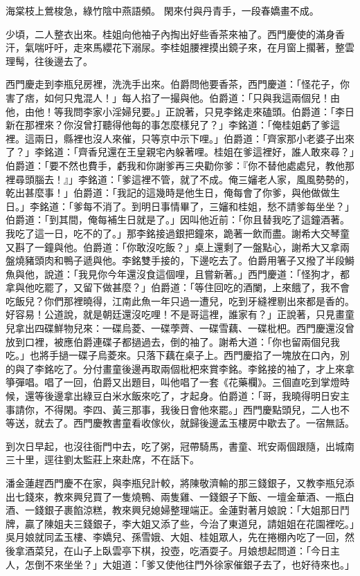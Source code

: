 海棠枝上鶯梭急，綠竹陰中燕語頻。
閑來付與丹青手，一段春嬌畫不成。

少頃，二人整衣出來。桂姐向他袖子內掏出好些香茶來袖了。西門慶使的滿身香汗，氣喘吁吁，走來馬纓花下溺尿。李桂姐腰裡摸出鏡子來，在月窗上擱著，整雲理髩，往後邊去了。

西門慶走到李瓶兒房裡，洗洗手出來。伯爵問他要香茶，西門慶道：「怪花子，你害了痞，如何只鬼混人！」每人掐了一撮與他。伯爵道：「只與我這兩個兒！由他，由他！等我問李家小淫婦兒要。」正說著，只見李銘走來磕頭。伯爵道：「李日新在那裡來？你沒曾打聽得他每的事怎麼樣兒了？」李銘道：「俺桂姐虧了爹這裡。這兩日，縣裡也沒人來催，只等京中示下哩。」伯爵道：「齊家那小老婆子出來了？」李銘道：「齊香兒還在王皇親宅內躲著哩。桂姐在爹這裡好，誰人敢來尋？」伯爵道：「要不然也費手，虧我和你謝爹再三央勸你爹：『你不替他處處兒，教他那裡尋頭腦去！』」李銘道：「爹這裡不管，就了不成。俺三嬸老人家，風風勢勢的，乾出甚麼事！」伯爵道：「我記的這幾時是他生日，俺每會了你爹，與他做做生日。」李銘道：「爹每不消了。到明日事情畢了，三嬸和桂姐，愁不請爹每坐坐？」伯爵道：「到其間，俺每補生日就是了。」因叫他近前：「你且替我吃了這鐘酒著。我吃了這一日，吃不的了。」那李銘接過銀把鐘來，跪著一飲而盡。謝希大交琴童又斟了一鐘與他。伯爵道：「你敢沒吃飯？」桌上還剩了一盤點心，謝希大又拿兩盤燒豬頭肉和鴨子遞與他。李銘雙手接的，下邊吃去了。伯爵用箸子又撥了半段鰣魚與他，說道：「我見你今年還沒食這個哩，且嘗新著。」西門慶道：「怪狗才，都拿與他吃罷了，又留下做甚麼？」伯爵道：「等住回吃的酒闌，上來餓了，我不會吃飯兒？你們那裡曉得，江南此魚一年只過一遭兒，吃到牙縫裡剔出來都是香的。好容易！公道說，就是朝廷還沒吃哩！不是哥這裡，誰家有？」正說著，只見畫童兒拿出四碟鮮物兒來：一碟烏菱、一碟荸薺、一碟雪藕、一碟枇杷。西門慶還沒曾放到口裡，被應伯爵連碟子都撾過去，倒的袖了。謝希大道：「你也留兩個兒我吃。」也將手撾一碟子烏菱來。只落下藕在桌子上。西門慶掐了一塊放在口內，別的與了李銘吃了。分付畫童後邊再取兩個枇杷來賞李銘。李銘接的袖了，才上來拿箏彈唱。唱了一回，伯爵又出題目，叫他唱了一套《花藥欄》。三個直吃到掌燈時候，還等後邊拿出綠豆白米水飯來吃了，才起身。伯爵道：「哥，我曉得明日安主事請你，不得閑。李四、黃三那事，我後日會他來罷。」西門慶點頭兒，二人也不等送，就去了。西門慶教書童看收傢伙，就歸後邊孟玉樓房中歇去了。一宿無話。

到次日早起，也沒往衙門中去，吃了粥，冠帶騎馬，書童、玳安兩個跟隨，出城南三十里，逕往劉太監莊上來赴席，不在話下。

潘金蓮趕西門慶不在家，與李瓶兒計較，將陳敬濟輸的那三錢銀子，又教李瓶兒添出七錢來，教來興兒買了一隻燒鴨、兩隻雞、一錢銀子下飯、一壇金華酒、一瓶白酒、一錢銀子裹餡涼糕，教來興兒媳婦整理端正。金蓮對著月娘說：「大姐那日鬥牌，贏了陳姐夫三錢銀子，李大姐又添了些，今治了東道兒，請姐姐在花園裡吃。」吳月娘就同孟玉樓、李嬌兒、孫雪娥、大姐、桂姐眾人，先在捲棚內吃了一回，然後拿酒菜兒，在山子上臥雲亭下棋，投壺，吃酒耍子。月娘想起問道：「今日主人，怎倒不來坐坐？」大姐道：「爹又使他往門外徐家催銀子去了，也好待來也。」

